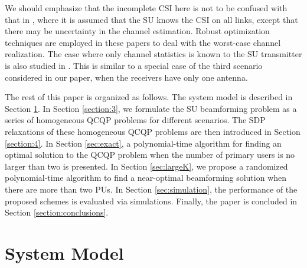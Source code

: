\documentclass[twocolumn,10pt]{IEEEtran}
\theoremstyle{plain} \newtheorem{theorem}{Theorem}
\theoremstyle{plain} \newtheorem{proposition}{Proposition}
\theoremstyle{plain} \newtheorem{corollary}{Corollary}
\theoremstyle{remark} \newtheorem{remark}{Remark}
\theoremstyle{remark} \newtheorem{lemma}{Lemma}
\theoremstyle{plain} \newtheorem{definition}{Definition}
\theoremstyle{plain} \newtheorem{assumption}{Assumption}
\theoremstyle{plain} \newtheorem{fact}{Fact}
\begin{document}
We should emphasize that the incomplete CSI here is not to be confused with that in \cite{ZLC08,GLM09,PVS+09}, where it is assumed that the SU knows the CSI on all links, except that there may be uncertainty in the channel estimation. Robust optimization techniques are employed in these papers to deal with the worst-case channel realization.  The case where only channel statistics is known to the SU transmitter is also studied in \cite{PVS+09}.  This is similar to a special case of the third scenario considered in our paper, when the receivers have only one antenna.

The rest of this paper is organized as follows. The system model is described in Section \ref{sec:2}. In Section \ref{section:3}, we formulate the SU beamforming problem as a series of homogeneous QCQP problems for different scenarios. The SDP relaxations of these homogeneous QCQP problems are then introduced in Section \ref{section:4}.  In Section \ref{sec:exact}, a polynomial-time algorithm for finding an optimal solution to the QCQP problem when the number of primary users is no larger than two is presented. In Section \ref{sec:largeK}, we propose a randomized polynomial-time algorithm to find a near-optimal beamforming solution when there are more than two PUs.  In Section \ref{sec:simulation}, the performance of the proposed schemes is evaluated via simulations. Finally, the paper is concluded in Section \ref{section:conclusions}.

\section{System Model}\label{sec:2}
\end{document}
